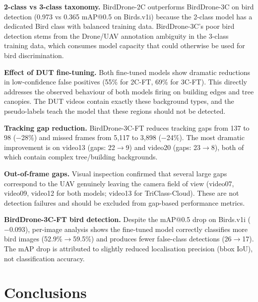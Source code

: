 \documentclass[11pt]{article}
\begin{document}
\textbf{2-class vs 3-class taxonomy.}
BirdDrone-2C outperforms BirdDrone-3C on bird detection (0.973 vs 0.365
mAP@0.5 on Birds.v1i) because the 2-class model has a dedicated Bird class
with balanced training data. BirdDrone-3C's poor bird detection stems from
the Drone/UAV annotation ambiguity in the 3-class training data, which
consumes model capacity that could otherwise be used for bird discrimination.

\textbf{Effect of DUT fine-tuning.}
Both fine-tuned models show dramatic reductions in low-confidence false
positives (55\% for 2C-FT, 69\% for 3C-FT). This directly addresses the
observed behaviour of both models firing on building edges and tree canopies.
The DUT videos contain exactly these background types, and the pseudo-labels
teach the model that these regions should not be detected.

\textbf{Tracking gap reduction.}
BirdDrone-3C-FT reduces tracking gaps from 137 to 98 ($-$28\%) and missed
frames from 5,117 to 3,898 ($-$24\%). The most dramatic improvement is on
video13 (gaps: 22$\to$9) and video20 (gaps: 23$\to$8), both of which contain
complex tree/building backgrounds.

\textbf{Out-of-frame gaps.}
Visual inspection confirmed that several large gaps correspond to the UAV
genuinely leaving the camera field of view (video07, video09, video12 for
both models; video13 for TriClass-Cloud). These are not detection failures
and should be excluded from gap-based performance metrics.

\textbf{BirdDrone-3C-FT bird detection.}
Despite the mAP@0.5 drop on Birds.v1i ($-$0.093), per-image analysis shows
the fine-tuned model correctly classifies more bird images (52.9\%$\to$59.5\%)
and produces fewer false-class detections (26$\to$17). The mAP drop is
attributed to slightly reduced localisation precision (bbox IoU), not
classification accuracy.

\section{Conclusions}
\end{document}
